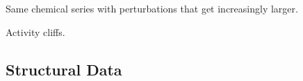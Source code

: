 \documentclass[9pt,bestpractices]{livecoms}
\begin{document}
Same chemical series with perturbations that get increasingly larger.

Activity cliffs.







\subsection{Structural Data}
\label{sec:struct_data}

\end{document}

